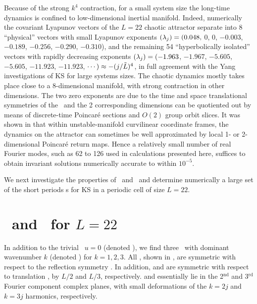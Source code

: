Because of the strong $k^4$ contraction, for a small system
size the long-time dynamics
is confined to low-dimensional
inertial manifold.
Indeed, numerically the covariant Lyapunov vectors of the
$L=22$ chaotic attractor separate into 8 ``physical''
vectors with small Lyapunov exponents
$(\lambda_j) = (0.048,$ 0, 0, $-0.003$, $-0.189$, $-0.256$,
$-0.290$, $-0.310$),
and the remaining 54 ``hyperbolically isolated'' vectors
with rapidly decreasing exponents
$(\lambda_j) = (-1.963$,   $-1.967$,   $-5.605$,   $-5.605$,  $-11.923$,  $-11.923$,
 $\cdots) \approx -(j/\tilde{L})^4$,
in full agreement with the Yang \etal{}
investigations of KS for large systems sizes.
The chaotic dynamics mostly takes place close to a
8-dimensional manifold, with strong contraction in other
dimensions.  The two zero exponents are due to the time and
space translational symmetries of the \KSe\ and the 2 corresponding
dimensions can be quotiented out by means of discrete-time
Poincar\'e sections and $O(2)$ group orbit slices.
It was shown
in  that within unstable-manifold
curvilinear coordinate frames, the dynamics on the attractor
can sometimes be well approximated by local 1- or 2-dimensional
Poincar\'e return maps.
Hence a relatively small number of real Fourier modes, such as 62
to 126 used in calculations presented here, suffices
to obtain  invariant
solutions numerically accurate to within $10^{-5}$.

We next investigate the properties of \eqva\ and \reqva\ and
determine numerically a large set of the short periods \rpo s
for KS in a periodic cell of size $L=22$.

\section{\Eqva\ and \reqva\ for $L=22$}

In addition to the trivial \eqv\ $u=0$ (denoted ),
we find three \eqva\ with dominant wavenumber $k$
(denoted ) for $k = 1, 2, 3$.  All {\eqva}, shown in
, are symmetric with respect to the reflection
symmetry .
In addition,  and  are symmetric with respect
to translation , by $L/2$ and $L/3$, respectively.
 and  essentially lie in
the 2$^\mathrm{nd}$ and 3$^\mathrm{rd}$ Fourier component complex planes,
with small  deformations of the $k=2j$ and $k=3j$ harmonics, respectively.


